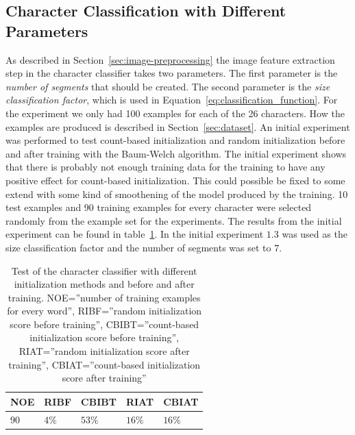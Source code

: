 \subsection{Character Classification with Different Parameters}\label{sec:character_classifier_results}

As described in Section~\ref{sec:image-preprocessing} the image feature extraction step in the character classifier takes two parameters.
The first parameter is the \textit{number of segments} that should be created. 
The second parameter is the \textit{size classification factor}, which is used in Equation~\ref{eq:classification_function}. 
For the experiment we only had 100 examples for each of the 26 characters. 
How the examples are produced is described in Section~\ref{sec:dataset}. 
An initial experiment was performed to test count-based initialization and random initialization before and after training with the Baum-Welch algorithm.
The initial experiment shows that there is probably not enough training data for the training to have any positive effect for count-based initialization. 
This could possible be fixed to some extend with some kind of smoothening of the model produced by the training. 
10 test examples and 90 training examples for every character were selected randomly from the example set for the experiments. 
The results from the initial experiment can be found in table~\ref{tab:character_classifier_initial_experiment}. 
In the initial experiment $1.3$ was used as the size classification factor and the number of segments was set to $7$.


\begin{table}[htb]
  \begin{center}
  \begin{tabular}{ l l l l l }
    NOE    & RIBF   & CBIBT  & RIAT    & CBIAT \\ \hline
    $90$  & $4\%$ & $53\%$ & $16\%$  & $16\%$  \\   
  \end{tabular}
\end{center}
\caption{Test of the character classifier with different initialization methods and before and after training.
	 NOE=''number of training examples for every word'',
         RIBF=''random initialization score before training'',
         CBIBT=''count-based initialization score before training'',
         RIAT=''random initialization score after training'',
         CBIAT=''count-based initialization score after training''} 
\label{tab:character_classifier_initial_experiment} 
\end{table}

